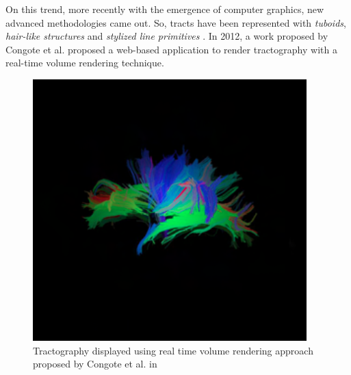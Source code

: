 \documentclass{article}
\begin{document}
\begin{multicols}{2}
On this trend, more recently with the emergence of computer graphics, new advanced methodologies came out. So, tracts have been represented with \textit{tuboids}\cite{petrovic2007visualizing}, \textit{hair-like structures} \cite{peeters2006visualization} and \textit{stylized line primitives} \cite{stoll2005visualization}. In 2012, a work proposed by Congote et al. proposed a web-based application to render tractography \cite{congote2012real} with a real-time volume rendering technique.

\begin{figure}[H]
\centering
\includegraphics[width = 0.9\columnwidth]{realTimeTractography}
\caption{Tractography displayed using real time volume rendering approach proposed by Congote et al. in \cite{congote2012real}}
\label{fig:weightedGraph}
\end{figure}



\end{multicols}
\end{document}
